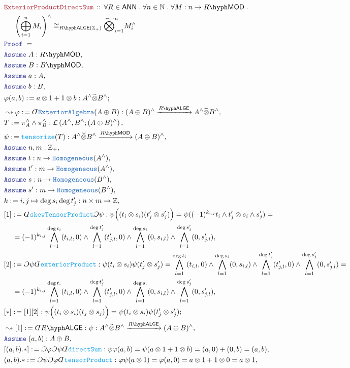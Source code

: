 \documentclass[12pt]{scrartcl}%
\newcommand{\TYPE}[1]{\textcolor{NavyBlue}{\mathtt{#1}}}%
\newcommand{\FUNC}[1]{\textcolor{Cerulean}{\mathtt{#1}}}%
\newcommand{\LOGIC}[1]{\textcolor{Blue}{\mathtt{#1}}}%
\newcommand{\THM}[1]{\textcolor{Maroon}{\mathtt{#1}}}%
\renewcommand{\.}{\; . \;} %
\newcommand{\de}{: \kern 0.1pc =} %
\newcommand{\Theorem}[2]{& \THM{#1} \, :: \, #2 \\ & \Proof = \\ } %
\newcommand{\NewLine}{\\ & \kern 1pc}%
\newcommand{\Page}[1]{ \begin{align*} #1 \end{align*}  }%
\newcommand{ \bd }{ \ByDef }%
\newcommand{\Int}{\mathbb{Z}}%
\newcommand{\Nat}{\mathbb{N}}%
\newcommand{\Say}[3]{& #1 \de #2 : #3, \\} %
\newcommand{\Conclude}[3]{& #1 \de #2 : #3; \\}%
\newcommand{\Derive}[3]{& \leadsto #1 \de #2 : #3, \\} %
\newcommand{\Assume}[2]{& \LOGIC{Assume} \; #1 : #2, \\} %
\newcommand{\ByDef}{\rotatebox[origin=c]{-180}{$D$}}%
\newcommand{\ByConstr}{\rotatebox[origin=c]{-180}{$C$}}%
\newcommand{\Proof}{\LOGIC{Proof} \; } %
\newcommand{\Arrow}[1]{\xrightarrow{#1}}%
\newcommand{\LMOD}[1]{#1\hyph\mathsf{MOD}} %
\renewcommand{\L}{\mathcal{L}}
\newcommand{\ANN}{\mathsf{ANN}} %
\newcommand{\LALGE}[1]{#1\hyph\mathsf{ALGE}}%
\begin{document}
\Page{
	\\
	\Theorem{ExteriorProductDirectSum}{
		\forall R \in \ANN \.
		\forall n \in \Nat \.
		\forall M : n \to \LMOD{R} \. \NewLine \, 
		\left( \bigoplus^n_{i=1} M_i \right)^\wedge \cong_{\LALGE{R}(\Int_+)}
		\widetilde{\bigotimes}_{i=1}^n M_i^\wedge
	}
	\Assume{A}{\LMOD{R}}
	\Assume{B}{\LMOD{B}}
	\Assume{a}{A}
	\Assume{b}{B}
	\Conclude{\varphi(a,b)}{  a \otimes 1 + 1 \otimes b}{  A^\wedge \widetilde{\otimes} B^\wedge}
	\Derive{\varphi}{\bd \TYPE{ExteriorAlgebra}(A \oplus B)}{ (A \oplus B)^\wedge \Arrow{\LALGE{R}} A^\wedge \widetilde{\otimes} B^\wedge   }
	\Say{T}{  \pi_A^\wedge  \wedge \pi_B^\wedge  }{ \L\left( A^\wedge, B^\wedge  ; (A \oplus B )^\wedge  \right)}
	\Say{\psi}{\FUNC{tensorize}(T)}{  A^\wedge \widetilde{\otimes} B^\wedge \Arrow{\LMOD{R}} (A \oplus B)^\wedge  }
	\Assume{n,m}{\Int_+}
	\Assume{t}{n \to \TYPE{Homogeneous}(A^\wedge)}
	\Assume{t'}{m \to \TYPE{Homogeneous}(A^\wedge)}
	\Assume{s}{n \to \TYPE{Homogeneous}(B^\wedge)}
	\Assume{s'}{m \to \TYPE{Homogeneous}(B^\wedge)}
	\Say{k}{ i,j \mapsto \deg s_i \deg t'_j}{ n \times m \to \Int }
	\Say{[1]}{\bd \FUNC{skewTensorProduct} \ByConstr \psi    }
	{
		\psi\Big( (t_i \otimes s_i) (t_j' \otimes s'_j) \Big) = 
		\psi( (-1)^{k_{i,j}}t_i \wedge t'_j \otimes s_i \wedge s'_j ) = \NewLine =
		(-1)^{k_{i,j}} \bigwedge^{\deg t_i}_{l=1} (t_{i,l},0) \wedge \bigwedge^{\deg t'_j}_{l=1} (t_{j,l}',0) 
		\wedge
		\bigwedge^{\deg s_i}_{l=1} (0,s_{i,l}) \wedge \bigwedge^{\deg s'_j}_{l=1} (0,s_{j,l}') 
	}
	\Say{[2]}{\ByConstr \psi \bd \FUNC{exteriorProduct}   }
	{
		\psi (t_i \otimes s_i) \psi (t_j' \otimes s'_j)  = 
		\bigwedge^{\deg t_i}_{l=1} (t_{i,l},0) \wedge \bigwedge^{\deg s_i}_{l=1} ( 0,s_{i,l}) 
		\wedge
		\bigwedge^{\deg t_j'}_{l=1} (t'_{j,l},0) \wedge \bigwedge^{\deg s'_j}_{l=1} (0,s_{j,l}') = \NewLine =
		(-1)^{k_{i,j}} \bigwedge^{\deg t_i}_{l=1} (t_{i,l},0) \wedge \bigwedge^{\deg t'_j}_{l=1} (t_{j,l}',0) 
		\wedge
		\bigwedge^{\deg s_i}_{l=1} (0,s_{i,l}) \wedge \bigwedge^{\deg s'_j}_{l=1} (0,s_{j,l}') 
	}
	\Conclude{[*]}{[1][2]}{\psi\Big((t_i \otimes s_i)(t_j \otimes s_j)\Big) = \psi(t_i \otimes s_i)\psi(t_j' \otimes s_j')}
	\Derive{[1]}{\bd \LALGE{R}}{ \psi : A^\wedge  \widetilde{\otimes} B^\wedge  \Arrow{\LALGE{R}} (A \oplus B)^\wedge }
	\Assume{(a,b)}{A \oplus B }
	\Say{[(a,b).*]}{ \ByConstr \varphi \ByConstr \psi \bd \FUNC{directSum} }{ \psi \varphi(a,b) = \psi( a \otimes 1 + 1 \otimes b  ) = (a,0) + (0,b) = (a,b)   }
	\Say{(a,b).*}{  \ByConstr \psi \ByConstr \varphi \bd \FUNC{tensorProduct} }{\varphi \psi (a \otimes 1)  =  \varphi (a,0) =  a \otimes 1 + 1 \otimes  0 = a \otimes 1  }
}
\end{document}
